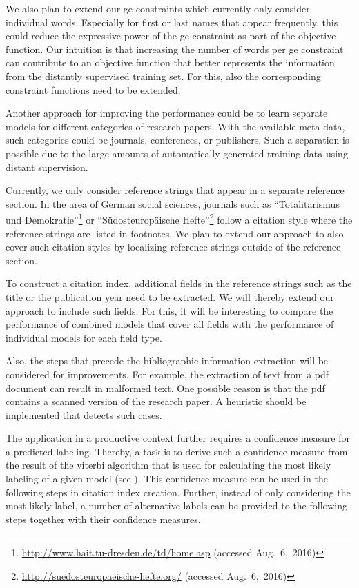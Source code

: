 We also plan to extend our \glspl{ge constraint} which currently only consider individual words.
Especially for first or last names that appear frequently, this could reduce the expressive power of the \gls{ge constraint} as part of the \gls{objective function}.
Our intuition is that increasing the number of words per \gls{ge constraint} can contribute to an \gls{objective function} that better represents the information from the distantly supervised training set.
For this, also the corresponding constraint functions need to be extended.

Another approach for improving the performance could be to learn separate models for different categories of research papers.
With the available meta data, such categories could be journals, conferences, or publishers.
Such a separation is possible due to the large amounts of automatically generated training data using distant supervision.

Currently, we only consider reference strings that appear in a separate reference section.
In the area of German social sciences, journals such as ``Totalitarismus und Demokratie''\footnote{\url{http://www.hait.tu-dresden.de/td/home.asp} (accessed Aug.~6,~2016)} or ``S\"{u}dosteuropäische Hefte''\footnote{\url{http://suedosteuropaeische-hefte.org/} (accessed Aug.~6,~2016)} follow a citation style where the reference strings are listed in footnotes.
We plan to extend our approach to also cover such citation styles by localizing reference strings outside of the reference section.

\bigskip

To construct a citation index, additional fields in the reference strings such as the title or the publication year need to be extracted.
We will thereby extend our approach to include such fields.
For this, it will be interesting to compare the performance of combined models that cover all fields with the performance of individual models for each field type.

Also, the steps that precede the bibliographic information extraction will be considered for improvements.
For example, the extraction of text from a \gls{pdf} document can result in malformed text.
One possible reason is that the \gls{pdf} contains a scanned version of the research paper.
A heuristic should be implemented that detects such cases.

The application in a productive context further requires a confidence measure for a predicted labeling.
Thereby, a task is to derive such a confidence measure from the result of the \gls{viterbi algorithm} that is used for calculating the most likely labeling of a given model (see ).
This confidence measure can be used in the following steps in citation index creation.
Further, instead of only considering the most likely label, a number of alternative labels can be provided to the following steps together with their confidence measures.

